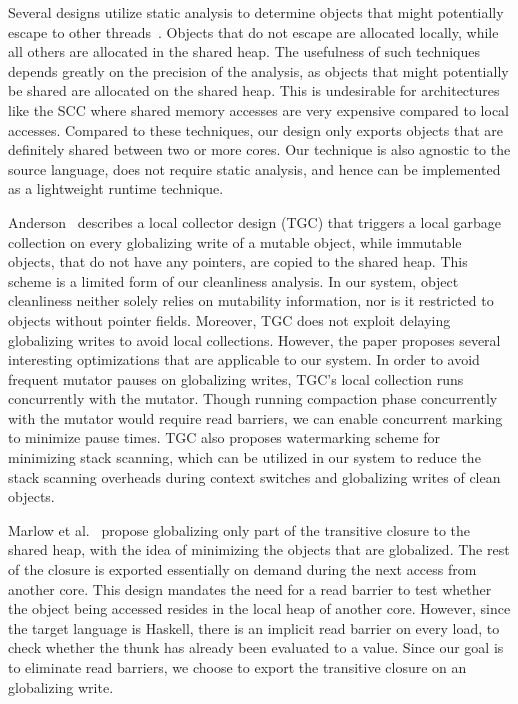 Several designs utilize static analysis to determine objects that might
potentially escape to other threads~\cite{Jones05, Steensgaard00}. Objects that
do not escape are allocated locally, while all others are allocated in the
shared heap. The usefulness of such techniques depends greatly on the precision
of the analysis, as objects that might potentially be shared are allocated on
the shared heap. This is undesirable for architectures like the SCC where
shared memory accesses are very expensive compared to local accesses. Compared
to these techniques, our design only exports objects that are definitely shared
between two or more cores. Our technique is also agnostic to the source
language, does not require static analysis, and hence can be implemented as a
lightweight runtime technique.

Anderson~\cite{Anderson10} describes a local collector design (TGC) that
triggers a local garbage collection on every globalizing write of a mutable
object, while immutable objects, that do not have any pointers, are copied to
the shared heap. This scheme is a limited form of our cleanliness analysis. In
our system, object cleanliness neither solely relies on mutability information,
nor is it restricted to objects without pointer fields. Moreover, TGC does not
exploit delaying globalizing writes to avoid local collections. However, the
paper proposes several interesting optimizations that are applicable to our
system. In order to avoid frequent mutator pauses on globalizing writes, TGC's
local collection runs concurrently with the mutator. Though running compaction
phase concurrently with the mutator would require read barriers, we can enable
concurrent marking to minimize pause times. TGC also proposes watermarking
scheme for minimizing stack scanning, which can be utilized in our system to
reduce the stack scanning overheads during context switches and globalizing
writes of clean objects.

Marlow et al.~\cite{Marlow11} propose globalizing only part of the transitive
closure to the shared heap, with the idea of minimizing the objects that are
globalized. The rest of the closure is exported essentially on demand during
the next access from another core. This design mandates the need for a read
barrier to test whether the object being accessed resides in the local heap of
another core. However, since the target language is Haskell, there is an
implicit read barrier on every load, to check whether the thunk has already
been evaluated to a value. Since our goal is to eliminate read barriers, we
choose to export the transitive closure on an globalizing write.

